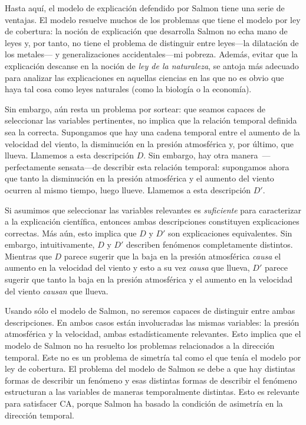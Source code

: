 Hasta aquí, el modelo de explicación defendido por Salmon
tiene una serie de ventajas. El modelo resuelve muchos de
los problemas que tiene el modelo por ley de cobertura: la
noción de explicación que desarrolla Salmon no echa mano de
leyes y, por tanto, no tiene el problema de distinguir entre
leyes---la dilatación de los metales--- y generalizaciones
accidentales---mi pobreza. Además, evitar que la
explicación descanse en la noción de \emph{ley de la
naturaleza}, se antoja más adecuado para analizar las
explicaciones en aquellas ciencias en las que no es obvio
que haya tal cosa como leyes naturales (como la biología o la economía).

Sin embargo, aún resta un problema por sortear: que seamos
capaces de seleccionar las variables pertinentes, no implica
que la relación temporal definida sea la correcta.
Supongamos que hay una cadena temporal entre el aumento de
la velocidad del viento, la disminución en la presión
atmosférica y, por último, que llueva. Llamemos a esta
descripción $ D $. Sin embargo, hay otra
manera~---perfectamente sensata---de describir esta relación
temporal: supongamos ahora que tanto la disminución en la
presión atmosférica y el aumento del viento ocurren al mismo
tiempo, luego llueve. Llamemos a esta descripción $ D' $.

Si asumimos que seleccionar las variables relevantes es
\emph{suficiente} para caracterizar a la explicación
científica, entonces ambas descripciones constituyen
explicaciones correctas. Más aún, esto implica que $ D  $ y
$  D' $ son explicaciones equivalentes. Sin embargo,
intuitivamente, $ D $ y $ D' $ describen fenómenos
completamente distintos. Mientras que $ D $ parece sugerir
que la baja en la presión atmosférica \emph{causa} el
aumento en la velocidad del viento y esto a su vez
\emph{causa} que llueva, $ D' $ parece sugerir que tanto la
baja en la presión atmosférica y el aumento en la velocidad
del viento \emph{causan} que llueva.

Usando sólo el modelo de Salmon, no seremos capaces de
distinguir entre ambas descripciones. En ambos casos están
involucradas las mismas variables: la presión atmosférica y
la velocidad, ambas estadísticamente relevantes.  
Esto implica que el modelo de Salmon no ha resuelto los
problemas relacionados a la dirección
temporal. Este no es un problema de simetría tal como el que
tenía el modelo por ley de cobertura. El problema del
modelo de Salmon se debe a que hay distintas formas de
describir un fenómeno y esas distintas formas de describir
el fenómeno estructuran a las variables de maneras
temporalmente distintas. Esto es relevante para satisfacer 
CA, porque Salmon ha basado la condición de asimetría en la dirección temporal.  


